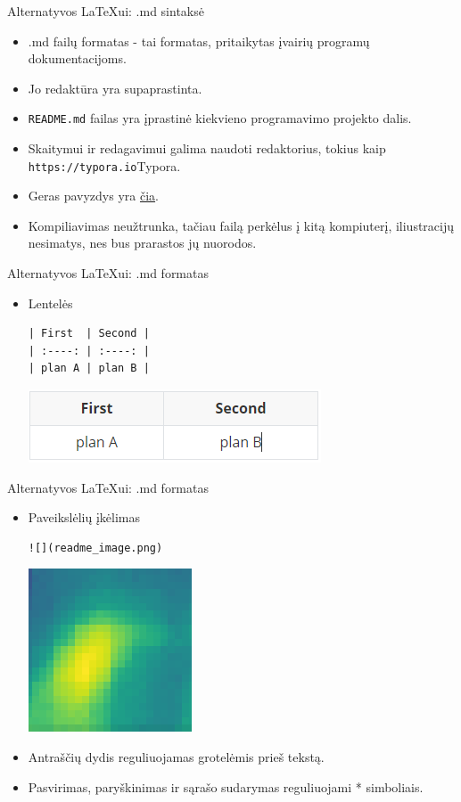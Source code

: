 \documentclass{beamer}
\begin{document}
\begin{frame}[fragile]{Alternatyvos LaTeXui: .md sintaksė}
\begin{itemize}
\item .md failų formatas - tai formatas, pritaikytas įvairių programų dokumentacijoms. 
\item Jo redaktūra yra supaprastinta. 
\item \texttt{README.md} failas yra įprastinė kiekvieno programavimo projekto dalis.
\item Skaitymui ir redagavimui galima naudoti redaktorius, tokius kaip \texttt{https://typora.io}{Typora}.
\item Geras pavyzdys yra \href{https://npm.pkg.github.com/Nimmel/Python}{čia}.
\item Kompiliavimas neužtrunka, tačiau failą perkėlus į kitą kompiuterį, iliustracijų nesimatys, nes bus prarastos jų nuorodos.
\end{itemize}
\end{frame}

\begin{frame}[fragile]{Alternatyvos LaTeXui: .md formatas}
\begin{itemize}
\item Lentelės
\begin{verbatim}
| First  | Second |
| :----: | :----: |
| plan A | plan B |
\end{verbatim}
\includegraphics[width=0.6 \textwidth]{lenteles.png}
\end{itemize}
\end{frame}

\begin{frame}[fragile]{Alternatyvos LaTeXui: .md formatas}
\begin{itemize}
\item Paveikslėlių įkėlimas
\begin{verbatim}
![](readme_image.png) 
\end{verbatim}
\includegraphics[width=0.3 \textwidth]{not_slight.png}
\item Antraščių dydis reguliuojamas grotelėmis prieš tekstą.
\item Pasvirimas, paryškinimas ir sąrašo sudarymas reguliuojami * simboliais.
\end{itemize}
\end{frame}
\end{document}
